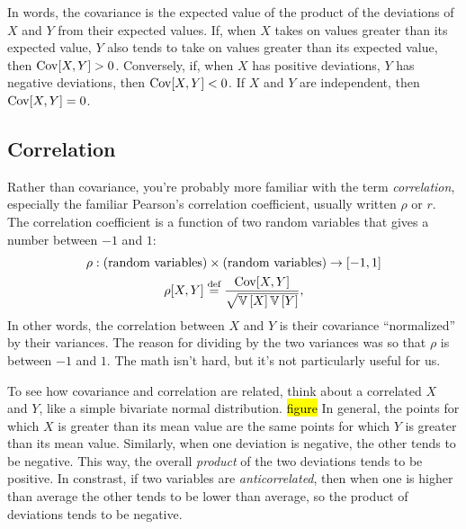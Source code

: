 In words, the covariance is the expected value of the product of the
deviations of $X$ and $Y$ from their expected values. If, when $X$ takes on
values greater than its expected value, $Y$ also tends to take on values
greater than its expected value, then $\mathrm{Cov}\!\left[{X, Y}\right] > 0$. Conversely, if, when
$X$ has positive deviations, $Y$ has negative deviations, then $\mathrm{Cov}\!\left[{X, Y}\right] <
0$. If $X$ and $Y$ are independent, then $\mathrm{Cov}\!\left[{X, Y}\right] = 0$.

\subsection{Correlation}

Rather than covariance, you're probably more familiar with the term
\emph{correlation}, especially the familiar Pearson's correlation coefficient,
usually written $\rho$ or $r$. The correlation coefficient is a function of
two random variables that gives a number between $-1$ and $1$:
\begin{gather*}
\rho : (\text{random variables}) \times (\text{random variables}) \to [-1, 1] \\
\rho[X, Y] \stackrel{\text{def}}{=} \frac{\mathrm{Cov}\!\left[{X, Y}\right]}{\sqrt{\mathbb{V}\left[{X}\right] \mathbb{V}\left[{Y}\right]}},
\end{gather*}
In other words, the correlation between $X$ and $Y$ is their covariance
``normalized'' by their variances. The reason for dividing by the two
variances was so that $\rho$ is between $-1$ and $1$. The math isn't hard, but
it's not particularly useful for us.


To see how covariance and correlation are related, think about a correlated
$X$ and $Y$, like a simple bivariate normal distribution. \hl{figure} In
general, the points for which $X$ is greater than its mean value are the same
points for which $Y$ is greater than its mean value. Similarly, when one
deviation is negative, the other tends to be negative. This way, the overall
\emph{product} of the two deviations tends to be positive. In constrast, if
two variables are \emph{anticorrelated}, then when one is higher than average
the other tends to be lower than average, so the product of deviations tends
to be negative.
